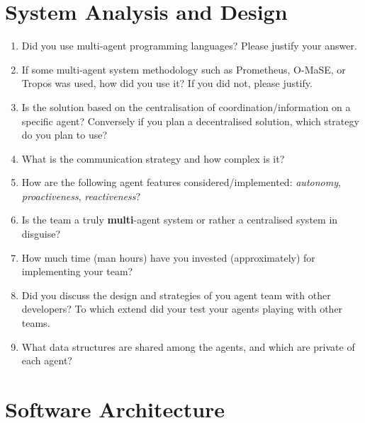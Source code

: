 \documentclass{llncs}
\begin{document}
\section{System Analysis and Design}

\begin{enumerate}
 \item Did you use multi-agent programming languages? Please justify your answer.
 \item If some multi-agent system methodology such as Prometheus,
   O-MaSE, or Tropos was used, how did you use it? If you did not, please justify.
 \item Is the solution based on the centralisation of
   coordination/information on a specific agent? Conversely if you
   plan a decentralised solution, which strategy do you plan to use?
 \item What is the communication strategy and how complex is it?
 \item How are the following agent features considered/implemented:
   \emph{autonomy}, \emph{proactiveness}, \emph{reactiveness}?
 \item Is the team a truly \textbf{multi}-agent system or rather a
   centralised system in disguise?
\item How much time (man hours) have you invested (approximately) for implementing your team?
\item Did you discuss the design and strategies of you agent team with other developers? To which extend did your test your agents playing with other teams.
\item What data structures are shared among the agents, and which are private of each agent?
\end{enumerate}

\section{Software Architecture}
\end{document}
